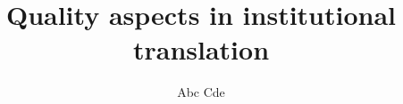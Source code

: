 \title{Quality aspects in institutional translation}  %
\author{Abc \lastand Cde}
\subtitle{}
\renewcommand{\lsISBNdigital}{000-0-000000-00-0}
\renewcommand{\lsISBNhardcover}{000-0-000000-00-0}
\renewcommand{\lsISBNsoftcover}{000-0-000000-00-0}
\renewcommand{\lsSeries}{tmnlp} %
\renewcommand{\lsSeriesNumber}{} %

  